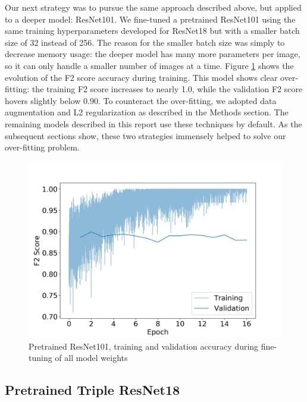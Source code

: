 \documentclass[10pt,twocolumn,letterpaper]{article}
\begin{document}
Our next strategy was to pursue the same approach described above, but applied to a deeper model: ResNet101. We fine-tuned a pretrained ResNet101 using the same training hyperparameters developed for ResNet18 but with a smaller batch size of 32 instead of 256. The reason for the smaller batch size was simply to decrease memory usage: the deeper model has many more parameters per image, so it can only handle a smaller number of images at a time. Figure \ref{fig:plot_validation_accuracy_resnet101_pretrained_tune} shows the evolution of the F2 score accuracy during training. This model shows clear over-fitting: the training F2 score increases to nearly 1.0, while the validation F2 score hovers slightly below 0.90. To counteract the over-fitting, we adopted data augmentation and L2 regularization as described in the Methods section. The remaining models described in this report use these techniques by default. As the subsequent sections show, these two strategies immensely helped to solve our over-fitting problem.

\begin{figure}
	\includegraphics[width=\columnwidth]{fig/plot_validation_accuracy_resnet101_pretrained_tune.png}
    \caption{Pretrained ResNet101, training and validation accuracy during fine-tuning of all model weights}
    \label{fig:plot_validation_accuracy_resnet101_pretrained_tune}
\end{figure}

\subsection*{Pretrained Triple ResNet18}
\end{document}
